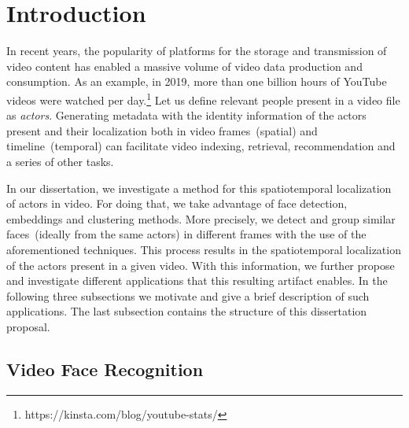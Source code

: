 \section{Introduction}

In recent years, the popularity of platforms for the storage and transmission of video content has enabled a massive volume of video data production and consumption.
As an example, in 2019, more than one billion hours of YouTube videos were watched per day.\footnote{https://kinsta.com/blog/youtube-stats/}
Let us define relevant people present in a video file as \emph{actors}.
Generating metadata with the identity information of the actors present and their localization both in video frames~(spatial) and timeline~(temporal) can facilitate video indexing, retrieval, recommendation and a series of other tasks.

In our dissertation, we investigate a method for this spatiotemporal localization of actors in video. For doing that, we take advantage of face detection, embeddings and clustering methods. More precisely, we detect and group similar faces~(ideally from the same actors) in different frames with the use of the aforementioned techniques. This process results in the spatiotemporal localization of the actors present in a given video. With this information, we further propose and investigate different applications that this resulting artifact enables. In the following three subsections we motivate and give a brief description of such applications. The last subsection contains the structure of this dissertation proposal.

\subsection{Video Face Recognition}

